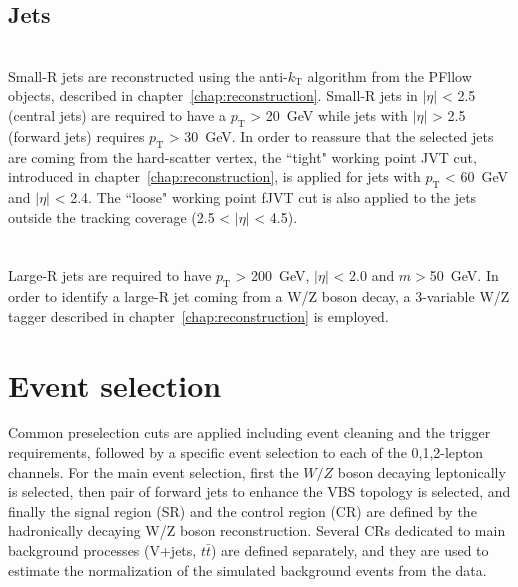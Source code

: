 \subsection{Jets}
\noindent\textbf{} \\ 
Small-R jets are reconstructed using the anti-$k_\mathrm{T}$ algorithm from the PFllow objects, described in chapter~\ref{chap:reconstruction}.
Small-R jets in $|\eta|$ < 2.5 (central jets) are required to have a $p_\mathrm{T}$ > 20~GeV while jets with $|\eta|$ > 2.5 (forward jets) requires $p_\mathrm{T}$ > 30~GeV. 
In order to reassure that the selected jets are coming from the hard-scatter vertex, the ``tight" working point JVT cut, introduced in chapter~\ref{chap:reconstruction}, is applied for jets with $p_\mathrm{T}$ < 60~GeV and $|\eta|$ < 2.4. The ``loose" working point fJVT cut is also applied to the jets outside the tracking coverage (2.5 < $|\eta|$ < 4.5).  \\ 
\\
\noindent\textbf{} \\ 
Large-R jets are required to have $p_\mathrm{T}$ > 200~GeV, $|\eta|$ < 2.0 and $m > $50~GeV. 
In order to identify a large-R jet coming from a W/Z boson decay, a 3-variable W/Z tagger described in chapter~\ref{chap:reconstruction} is employed. 
\section{Event selection}
\label{sec:eventselection}
Common preselection cuts are applied including event cleaning and the trigger requirements, followed by a specific event selection to each of the 0,1,2-lepton channels.
For the main event selection, first the $W/Z$ boson decaying leptonically is selected, then pair of forward jets to enhance the VBS topology is selected, and finally the signal region (SR) and the control region (CR) are defined by the hadronically decaying W/Z boson reconstruction. Several CRs dedicated to main background processes (V+jets, $t\bar{t}$) are defined separately, and they are used to estimate the normalization of the simulated background events from the data.

